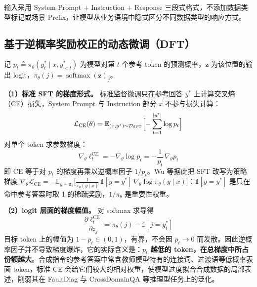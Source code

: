 \documentclass[fontset=fandol,type=master,campus=shenzhen,etitleauto=true]{hithesisbook}
\begin{document}
输入采用 System Prompt + Instruction + Response 三段式格式，不添加数据类型标记或场景 Prefix，让模型从业务语境中隐式区分不同数据类型的响应方式。

\subsection{基于逆概率奖励校正的动态微调（DFT）}\label{ux8badux7ec3ux914dux7f6eux4e0eux4f18ux5316}

记 $p_t \triangleq \pi_\theta(y_t^* \mid x, y_{<t}^*)$ 为模型对第 $t$ 个参考 token 的预测概率，$\mathbf{z}$ 为该位置的输出 logit，$\pi_\theta(j) = \operatorname{softmax}(\mathbf{z})_j$。

\textbf{（1）标准 SFT 的梯度形式。} 标准监督微调只在参考回答 $y^*$ 上计算交叉熵（CE）损失，System Prompt 与 Instruction 部分 $x$ 不参与损失计算：
\begin{equation}
\mathcal{L}_{\text{CE}}(\theta) = \mathbb{E}_{(x, y^*) \sim \mathcal{D}_{\text{SFT}}} \Bigl[ -\sum_{t=1}^{|y^*|} \log p_t \Bigr]
\end{equation}
对单个 token 求参数梯度：
\begin{equation}\label{eq:ce-grad}
\nabla_\theta \ell_t^{\text{CE}} = -\nabla_\theta \log p_t = -\frac{1}{p_t}\,\nabla_\theta p_t
\end{equation}
即 CE 等于对 $p_t$ 的梯度再乘以逆概率因子 $1/p_t$。Wu 等\cite{ref82}据此把 SFT 改写为策略梯度 $\nabla_\theta \mathcal{L}_{\text{CE}} = -\mathbb{E}_{y \sim \pi_\theta}\bigl[\tfrac{1}{\pi_\theta(y \mid x)}\,\mathbb{1}[y = y^*]\,\nabla_\theta \log \pi_\theta(y \mid x)\bigr]$：$\mathbb{1}[y = y^*]$ 是只在命中参考答案时取 1 的稀疏奖励，$1/\pi_\theta$ 是重要性权重。

\textbf{（2）logit 层面的梯度幅值。} 对 softmax 求导得
\begin{equation}\label{eq:ce-logit}
\frac{\partial \ell_t^{\text{CE}}}{\partial z_j} = \pi_\theta(j) - \mathbb{1}[j = y_t^*]
\end{equation}
目标 token 上的幅值为 $1 - p_t \in (0, 1)$，有界，不会因 $p_t \to 0$ 而发散。因此逆概率因子并不导致梯度爆炸，它的实际含义是：\textbf{$p_t$ 越低的 token，在总梯度中所占份额越大}。合成指令的参考答案中常含教师模型特有的连接词、过渡语等低概率表面 token，标准 CE 会给它们较大的相对权重，使模型过度拟合合成数据的局部表述，削弱其在 FaultDiag 与 CrossDomainQA 等推理型任务上的泛化。
\end{document}
